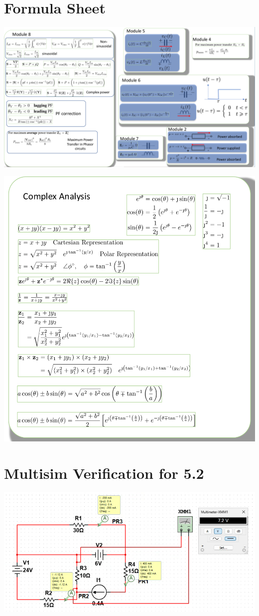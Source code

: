 \documentclass[12pt,letterpaper]{article} \usepackage{amsmath} \usepackage{graphicx} \usepackage[margin=1in]{geometry} \usepackage{longtable}  \usepackage{amssymb}
\begin{document}
	\section{Formula Sheet}
	\begin{center}
		\includegraphics[width=0.99\linewidth]{formulaside1}
	\end{center}
	\begin{center}
		\includegraphics[width=0.5\linewidth]{formulaside2}
	\end{center}
	
	
	\section{Multisim Verification for 5.2}
	\begin{center}
		\includegraphics[width=0.8\linewidth]{ex3-5}
	\end{center}
\end{document}

